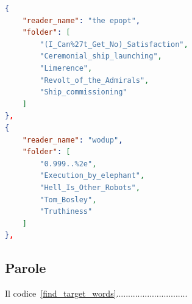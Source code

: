 \documentclass[12pt,a4paper,titlepage]{article}
\begin{document}
\begin{lstlisting}[language=json,firstnumber=1, caption=Formato del file readers\_paths.json, label=JSON_lettori,captionpos=b]
{
	"reader_name": "the epopt",
	"folder": [
		"(I_Can%27t_Get_No)_Satisfaction",
		"Ceremonial_ship_launching",
		"Limerence",
		"Revolt_of_the_Admirals",
		"Ship_commissioning"
	]
},
{
	"reader_name": "wodup",
	"folder": [
		"0.999..%2e",
		"Execution_by_elephant",
		"Hell_Is_Other_Robots",
		"Tom_Bosley",
		"Truthiness"
	]
},
\end{lstlisting}

\subsection{Parole}
\label{subsec:parole}
Il codice~\ref{find_target_words}..............................
\end{document}

